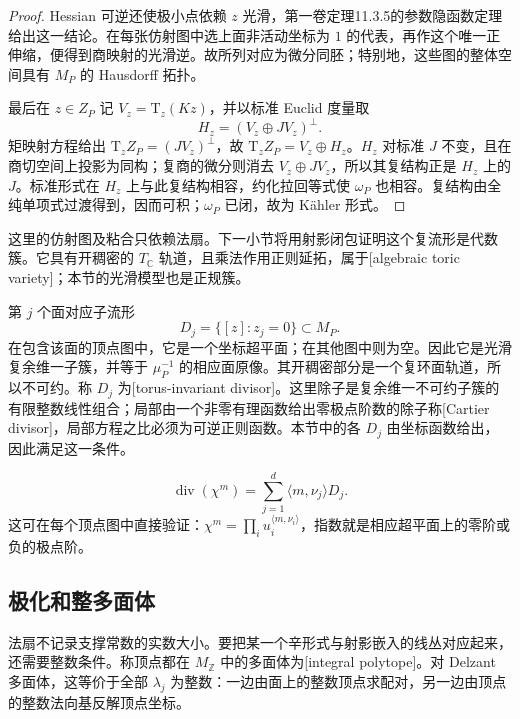 \begin{proof}
	Hessian 可逆还使极小点依赖 \(z\) 光滑，第一卷定理11.3.5的参数隐函数定理给出这一结论。在每张仿射图中选上面非活动坐标为 \(1\) 的代表，再作这个唯一正伸缩，便得到商映射的光滑逆。故所列对应为微分同胚；特别地，这些图的整体空间具有 \(M_P\) 的 Hausdorff 拓扑。

	最后在 \(z\in Z_P\) 记 \(V_z=\mathrm{T}_z(Kz)\)，并以标准 Euclid 度量取
	\[
		H_z=(V_z\oplus JV_z)^\perp.
	\]
	矩映射方程给出 \(\mathrm{T}_zZ_P=(JV_z)^\perp\)，故
	\(\mathrm{T}_zZ_P=V_z\oplus H_z\)。\(H_z\) 对标准 \(J\) 不变，且在商切空间上投影为同构；复商的微分则消去 \(V_z\oplus JV_z\)，所以其复结构正是 \(H_z\) 上的 \(J\)。标准形式在 \(H_z\) 上与此复结构相容，约化拉回等式使 \(\omega_P\) 也相容。复结构由全纯单项式过渡得到，因而可积；\(\omega_P\) 已闭，故为 Kähler 形式。
\end{proof}

这里的仿射图及粘合只依赖法扇。下一小节将用射影闭包证明这个复流形是代数簇。它具有开稠密的 \(T_{\mathbb C}\) 轨道，且乘法作用正则延拓，属于[algebraic toric variety]；本节的光滑模型也是正规簇。

\ProseParagraphBreak

第 \(j\) 个面对应子流形
\[
	D_j=\{[z]:z_j=0\}\subset M_P.
\]
在包含该面的顶点图中，它是一个坐标超平面；在其他图中则为空。因此它是光滑复余维一子簇，并等于 \(\mu_P^{-1}\) 的相应面原像。其开稠密部分是一个复环面轨道，所以不可约。称 \(D_j\) 为[torus-invariant divisor]。这里除子是复余维一不可约子簇的有限整数线性组合；局部由一个非零有理函数给出零极点阶数的除子称[Cartier divisor]，局部方程之比必须为可逆正则函数。本节中的各 \(D_j\) 由坐标函数给出，因此满足这一条件。

\begin{equation}\label{g4:eq:1205:character-divisor}
	\operatorname{div}(\chi^m)
	=\sum_{j=1}^d\langle m,\nu_j\rangle D_j.
\end{equation}
这可在每个顶点图中直接验证：\(\chi^m=\prod_i u_i^{\langle m,\nu_i\rangle}\)，指数就是相应超平面上的零阶或负的极点阶。

\subsection{极化和整多面体}
\label{g4:subsec:1205:02}

法扇不记录支撑常数的实数大小。要把某一个辛形式与射影嵌入的线丛对应起来，还需要整数条件。称顶点都在 \(M_{\mathbb Z}\) 中的多面体为[integral polytope]。对 Delzant 多面体，这等价于全部 \(\lambda_j\) 为整数：一边由面上的整数顶点求配对，另一边由顶点的整数法向基反解顶点坐标。

